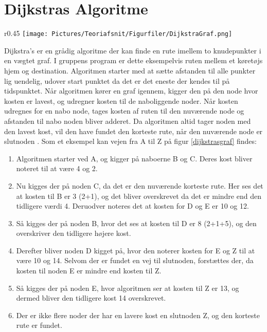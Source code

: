 \section{Dijkstras Algoritme}
\begin{wrapfigure}{r}{0.45\textwidth}
    \centering
	\texttt{[image: Pictures/Teoriafsnit/Figurfiler/DijkstraGraf.png]}
	\label{dijkstrasgraf}
	\caption{En vægtet graf}
\end{wrapfigure}

Dijkstra's er en grådig algoritme der kan finde en rute imellem to knudepunkter i en vægtet graf. I gruppens program er dette eksempelvis ruten mellem et køretøjs hjem og destination. Algoritmen starter med at sætte afstanden til alle punkter lig uendelig, udover start punktet da det er det eneste der kendes til på tidspunktet. Når algoritmen kører en graf igennem, kigger den på den node hvor kosten er lavest, og udregner kosten til de naboliggende noder. Når kosten udregnes for en nabo node, tages kosten af ruten til den nuværende node og afstanden til nabo noden bliver adderet. Da algoritmen altid tager noden med den lavest kost, vil den have fundet den korteste rute, når den nuværende node er slutnoden \cite[s. 681-684]{DMATBOGEN}. Som et eksempel kan vejen fra A til Z på figur \ref{dijkstrasgraf} findes:

\begin{enumerate}
\item Algoritmen starter ved A, og kigger på naboerne B og C. Deres kost bliver noteret til at være 4 og 2.
\item Nu kigges der på noden C, da det er den nuværende korteste rute. Her ses det at kosten til B er 3 (2+1), og det bliver overskrevet da det er mindre end den tidligere værdi 4. Deruodver noteres det at kosten for D og E er 10 og 12.
\item Så kigges der på noden B, hvor det ses at kosten til D er 8 (2+1+5), og den overskriver den tidligere højere kost.
\item Derefter bliver noden D kigget på, hvor den noterer kosten for E og Z til at være 10 og 14. Selvom der er fundet en vej til slutnoden, forstættes der, da kosten til noden E er mindre end kosten til Z.
\item Så kigges der på noden E, hvor algoritmen ser at kosten til Z er 13, og dermed bliver den tidligere kost 14 overskrevet.
\item Der er ikke flere noder der har en lavere kost en slutnoden Z, og den korteste rute er fundet.
\end{enumerate}

